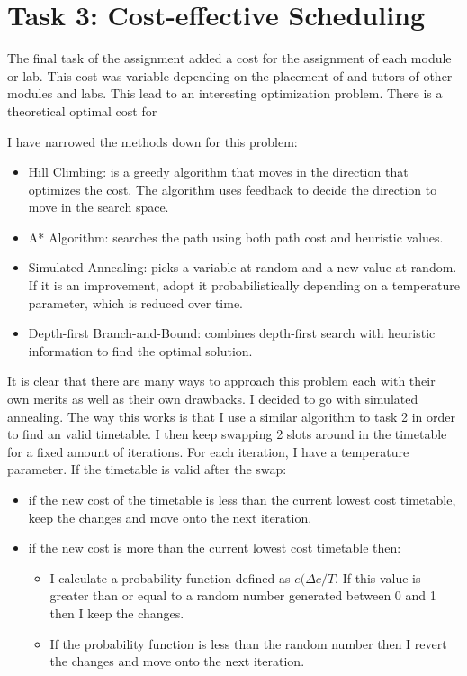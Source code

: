\documentclass[conference]{IEEEtran}
\begin{document}
\section{Task 3: Cost-effective Scheduling}
The final task of the assignment added a cost for the assignment of each module or lab. This cost was variable depending on the placement of and tutors of other modules and labs. This lead to an interesting optimization problem. 
There is a theoretical optimal cost for 


I have narrowed the methods down for this problem:

\begin{itemize}
\item Hill Climbing: is a greedy algorithm that moves in the direction that optimizes the cost. The algorithm uses feedback to decide the direction to move in the search space.
\item A* Algorithm: searches the path using both path cost and heuristic values.
\item Simulated Annealing: picks a variable at random and a new value at random. If it is an improvement, adopt it probabilistically depending on a temperature parameter, which is reduced over time.
\item Depth-first Branch-and-Bound: combines depth-first search with heuristic information to find the optimal solution.
\end{itemize}
It is clear that there are many ways to approach this problem each with their own merits as well as their own drawbacks. I decided to go with simulated annealing. The way this works is that I use a similar algorithm to task 2 in order to find an valid timetable. I then keep swapping 2 slots around in the timetable for a fixed amount of iterations. For each iteration, I have a temperature parameter. If the timetable is valid after the swap:
\begin{itemize}
\item if the new cost of the timetable is less than the current lowest cost timetable, keep the changes and move onto the next iteration.
\item if the new cost is more than the current lowest cost timetable then:
    \begin{itemize}
    \item I calculate a probability function defined as \(e(\Delta c / T \). If this value is greater than or equal to a random number generated between 0 and 1 then I keep the changes.
    \item If the probability function is less than the random number then I revert the changes and move onto the next iteration. 
    \end{itemize}
\end{itemize}
\end{document}
